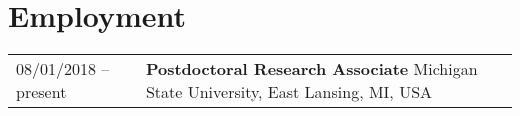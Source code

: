 \section*{Employment}
\begin{tabular}{p{} p{}}
08/01/2018 -- present & \textbf{Postdoctoral Research Associate} \newline
		                Michigan State University, East Lansing, MI, USA \\ 
\end{tabular}
